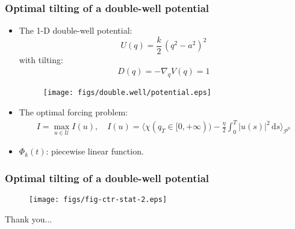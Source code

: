 \documentclass[fleqn]{beamer}
\newcommand{\bluec}[1]{{\color{blue} #1}}
\newcommand{\dd}[0]{\textrm{d}}
\newcommand{\pathmeas}{\mathcal P}
\begin{document}
\begin{frame}
  \frametitle{Optimal tilting of a double-well potential}
  \begin{itemize}
  \item<1-> 
    \begin{minipage}[t]{0.6\linewidth}
      The 1-D double-well potential:
      \bluec{
        \begin{equation*}
          U(q) = \frac k2\, (q^2 - a^2)^2
        \end{equation*}
      }
      with tilting:
      \bluec{
        \begin{align*}
          D(q) = -\nabla_q V(q) = 1
        \end{align*}
      }
    \end{minipage}
    \hfill
    \begin{minipage}[t]{0.350\linewidth}
      \begin{figure}
        \centering
        \texttt{[image: figs/double.well/potential.eps]}
      \end{figure}
    \end{minipage}
    \hfill
  \item<2-> The optimal forcing problem:
    \bluec{
      \begin{align*}
        I = \max_{u\in\mathcal U} I(u), \quad
        I(u) =
        \bigg\langle
        \chi(q_T\in [0,+\infty)) - \frac\eta 2\int_0^T\vert u(s)\vert^2\,\dd s
        \bigg\rangle_{\pathmeas^0}
      \end{align*}
    }
  \item<3-> \bluec{$\Phi_k(t)$}: piecewise linear function.
  \end{itemize}
\end{frame}


\begin{frame}
  \frametitle{Optimal tilting of a double-well potential}
  \begin{figure}
    \centering
    \texttt{[image: figs/fig-ctr-stat-2.eps]}
  \end{figure}
\end{frame}








\begin{frame}
  Thank you...
\end{frame}
\end{document}
